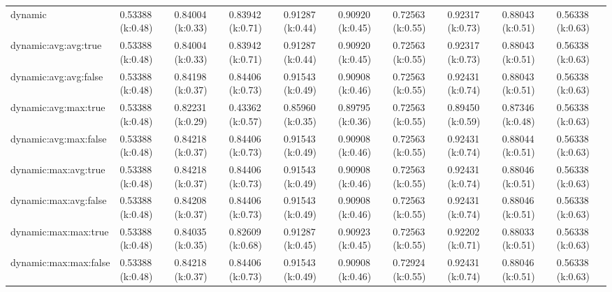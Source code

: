 \begin{tabular}{llllllllll}
dynamic               &            0.53388 (k:0.48) &  0.84004 (k:0.33) &  0.83942 (k:0.71) &  0.91287 (k:0.44) &  0.90920 (k:0.45) &  0.72563 (k:0.55) &  0.92317 (k:0.73) &  0.88043 (k:0.51) &  0.56338 (k:0.63) \\
dynamic:avg:avg:true  &            0.53388 (k:0.48) &  0.84004 (k:0.33) &  0.83942 (k:0.71) &  0.91287 (k:0.44) &  0.90920 (k:0.45) &  0.72563 (k:0.55) &  0.92317 (k:0.73) &  0.88043 (k:0.51) &  0.56338 (k:0.63) \\
dynamic:avg:avg:false &            0.53388 (k:0.48) &  0.84198 (k:0.37) &  0.84406 (k:0.73) &  0.91543 (k:0.49) &  0.90908 (k:0.46) &  0.72563 (k:0.55) &  0.92431 (k:0.74) &  0.88043 (k:0.51) &  0.56338 (k:0.63) \\
dynamic:avg:max:true  &            0.53388 (k:0.48) &  0.82231 (k:0.29) &  0.43362 (k:0.57) &  0.85960 (k:0.35) &  0.89795 (k:0.36) &  0.72563 (k:0.55) &  0.89450 (k:0.59) &  0.87346 (k:0.48) &  0.56338 (k:0.63) \\
dynamic:avg:max:false &            0.53388 (k:0.48) &  0.84218 (k:0.37) &  0.84406 (k:0.73) &  0.91543 (k:0.49) &  0.90908 (k:0.46) &  0.72563 (k:0.55) &  0.92431 (k:0.74) &  0.88044 (k:0.51) &  0.56338 (k:0.63) \\
dynamic:max:avg:true  &            0.53388 (k:0.48) &  0.84218 (k:0.37) &  0.84406 (k:0.73) &  0.91543 (k:0.49) &  0.90908 (k:0.46) &  0.72563 (k:0.55) &  0.92431 (k:0.74) &  0.88046 (k:0.51) &  0.56338 (k:0.63) \\
dynamic:max:avg:false &            0.53388 (k:0.48) &  0.84208 (k:0.37) &  0.84406 (k:0.73) &  0.91543 (k:0.49) &  0.90908 (k:0.46) &  0.72563 (k:0.55) &  0.92431 (k:0.74) &  0.88046 (k:0.51) &  0.56338 (k:0.63) \\
dynamic:max:max:true  &            0.53388 (k:0.48) &  0.84035 (k:0.35) &  0.82609 (k:0.68) &  0.91287 (k:0.45) &  0.90923 (k:0.45) &  0.72563 (k:0.55) &  0.92202 (k:0.71) &  0.88033 (k:0.51) &  0.56338 (k:0.63) \\
dynamic:max:max:false &            0.53388 (k:0.48) &  0.84218 (k:0.37) &  0.84406 (k:0.73) &  0.91543 (k:0.49) &  0.90908 (k:0.46) &  0.72924 (k:0.55) &  0.92431 (k:0.74) &  0.88046 (k:0.51) &  0.56338 (k:0.63) \\
\bottomrule
\end{tabular}
